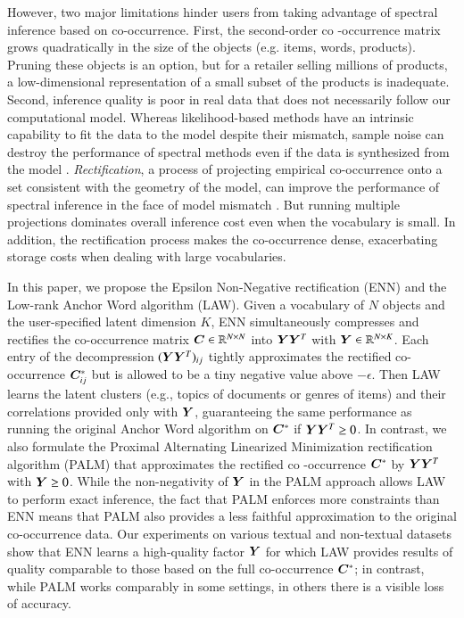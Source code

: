 However, two major limitations hinder users from taking advantage of spectral
inference based on co\hyp{}occurrence. First, the second-order co
\hyp{}occurrence matrix grows quadratically in the size of the objects (e.g.
items, words, products). Pruning these objects is an option, but for a retailer
selling millions of products, a low-dimensional representation of a small subset
of the products is inadequate. Second, inference quality is poor in real data
that does not necessarily follow our computational model. Whereas
likelihood-based methods have an intrinsic capability to fit the data to the
model despite their mismatch, sample noise can destroy the  performance of
spectral methods even if the data is synthesized from the model 
\cite{kulesza2014low}. {\em Rectification}, a process of projecting empirical
co\hyp{}occurrence onto a set consistent with the geometry of the model, can
improve the performance of spectral inference in the face of model mismatch 
\cite{moontae2015nips}. But running multiple projections dominates overall
inference cost even when the vocabulary is small. In addition, the rectification
process makes the co\hyp{}occurrence dense, exacerbating storage costs when
dealing with large vocabularies.

In this paper, we propose the Epsilon Non-Negative rectification (ENN) and the
Low-rank Anchor Word algorithm (LAW). Given a vocabulary of $N$ objects and the
user-specified latent dimension $K$, ENN simultaneously compresses and rectifies
the co\hyp{}occurrence matrix $\bm{C} \mathrel{\in} \mathbb{R}^{N \mathrel{\times} N}$ into $\bm{Y} \bm{Y}^T$ with
$\bm{Y} \mathrel{\in} \mathbb{R}^{N \mathrel{\times} K}$. Each entry of the decompression $(\bm{Y} \bm{Y}^T)_{ij}$
tightly approximates the rectified co\hyp{}occurrence $\bm{C}^*_{ij}$ but is
allowed to be a tiny negative value above $-\epsilon$. Then LAW learns the
latent clusters (e.g., topics of documents or genres of items) and their
correlations provided only with $\bm{Y}$, guaranteeing the same performance as
running the original Anchor Word algorithm on $\bm{C}^*$ if $\bm{Y} \bm{Y}^T \mathrel{\geq} 0$. In
contrast, we also formulate the Proximal Alternating Linearized Minimization 
rectification algorithm (PALM) that approximates the rectified co
\hyp{}occurrence $\bm{C}^*$ by $\bm{Y} \bm{Y}^T$ with $\bm{Y} \mathrel{\geq} 0$. While the
non-negativity of $\bm{Y}$ in the PALM approach allows LAW to perform exact
inference, the fact that PALM enforces more constraints than ENN means that PALM
also provides a less faithful approximation to the original co\hyp{}occurrence
data. Our experiments on various textual and non-textual datasets show that ENN
learns a high-quality factor $\bm{Y}$ for which LAW provides results of quality
comparable to those based on the full co\hyp{}occurrence $\bm{C}^*$; in contrast,
while PALM works comparably in some settings, in others there is a visible loss
of accuracy.

